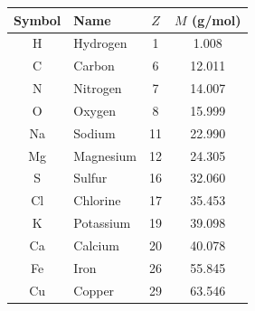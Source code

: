 \documentclass[11pt, openany]{book}
\theoremstyle{plain}
\theoremstyle{definition}
\theoremstyle{remark}
\begin{document}
\begin{center}
\renewcommand{\arraystretch}{1.45}
\begin{tabular}{clcc}
\toprule
\textbf{Symbol} & \textbf{Name} & \textbf{$Z$} & \textbf{$M$ (g/mol)} \\
\midrule
H  & Hydrogen  & 1  & 1.008  \\
C  & Carbon    & 6  & 12.011 \\
N  & Nitrogen  & 7  & 14.007 \\
O  & Oxygen    & 8  & 15.999 \\
Na & Sodium    & 11 & 22.990 \\
Mg & Magnesium & 12 & 24.305 \\
S  & Sulfur    & 16 & 32.060 \\
Cl & Chlorine  & 17 & 35.453 \\
K  & Potassium & 19 & 39.098 \\
Ca & Calcium   & 20 & 40.078 \\
Fe & Iron      & 26 & 55.845 \\
Cu & Copper    & 29 & 63.546 \\
\bottomrule
\end{tabular}
\end{center}



\end{document}
